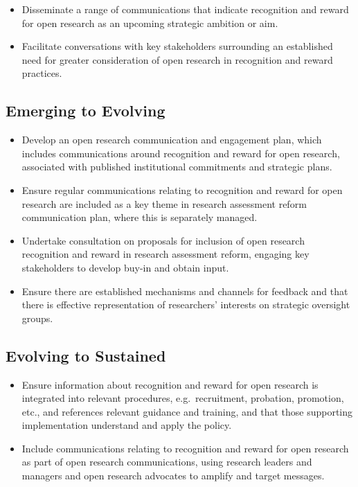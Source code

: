 \documentclass[
  letterpaper,
  DIV=11,
  numbers=noendperiod,
  oneside]{scrreprt}
\begin{document}
\begin{itemize}
\item
  Disseminate a range of communications that indicate recognition and
  reward for open research as an upcoming strategic ambition or aim.
\item
  Facilitate conversations with key stakeholders surrounding an
  established need for greater consideration of open research in
  recognition and reward practices.
\end{itemize}

\subsection{Emerging to Evolving}\label{emerging-to-evolving-3}

\begin{itemize}
\item
  Develop an open research communication and engagement plan, which
  includes communications around recognition and reward for open
  research, associated with published institutional commitments and
  strategic plans.
\item
  Ensure regular communications relating to recognition and reward for
  open research are included as a key theme in research assessment
  reform communication plan, where this is separately managed.
\item
  Undertake consultation on proposals for inclusion of open research
  recognition and reward in research assessment reform, engaging key
  stakeholders to develop buy-in and obtain input.
\item
  Ensure there are established mechanisms and channels for feedback and
  that there is effective representation of researchers' interests on
  strategic oversight groups.
\end{itemize}

\subsection{Evolving to Sustained}\label{evolving-to-sustained-3}

\begin{itemize}
\item
  Ensure information about recognition and reward for open research is
  integrated into relevant procedures, e.g.~recruitment, probation,
  promotion, etc., and references relevant guidance and training, and
  that those supporting implementation understand and apply the policy.
\item
  Include communications relating to recognition and reward for open
  research as part of open research communications, using research
  leaders and managers and open research advocates to amplify and target
  messages.
\end{itemize}
\end{document}
